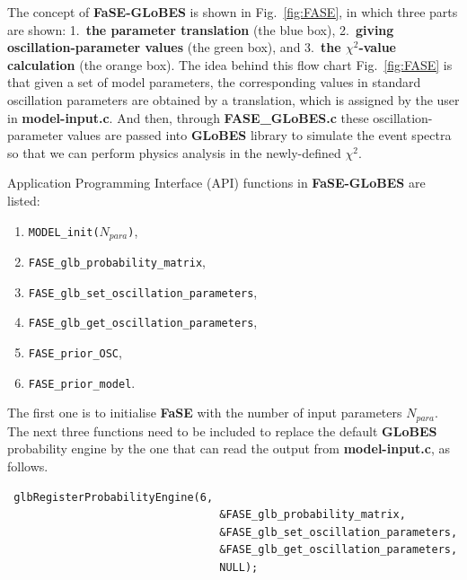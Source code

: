 \documentclass[aps,prd,nofootinbib,preprint]{revtex4}
\begin{document}
The concept of \textbf{FaSE-GLoBES} is shown in Fig.~\ref{fig:FASE}, in which three parts are shown: 1.~\textbf{the parameter translation} (the blue box), 2.~\textbf{giving oscillation-parameter values} (the green box), and 3.~\textbf{the $\chi^2$-value calculation} (the orange box). 
The idea behind this flow chart Fig.~\ref{fig:FASE} is that given a set of model parameters, the corresponding values in standard oscillation parameters are obtained by a translation, which is assigned by the user in \textbf{model-input.c}. And then, through \textbf{FASE\_GLoBES.c} these oscillation-parameter values are passed into \textbf{GLoBES} library to simulate the event spectra so that we can perform physics analysis in the newly-defined $\chi^2$. 


Application Programming Interface (API) functions in \textbf{FaSE-GLoBES} are listed:
\begin{enumerate}
\item \texttt{MODEL\_init($N_{para}$)},
\item  \texttt{FASE\_glb\_probability\_matrix},
\item  \texttt{FASE\_glb\_set\_oscillation\_parameters},
\item  \texttt{FASE\_glb\_get\_oscillation\_parameters},
\item \texttt{FASE\_prior\_OSC},
\item \texttt{FASE\_prior\_model}.
\end{enumerate}
The first one is to initialise \textbf{FaSE} with the number of input parameters $N_{para}$. The next three functions need to be included to replace the default \textbf{GLoBES} probability engine by the one that can read the output from \textbf{model-input.c}, as follows.
\begin{verbatim}
 glbRegisterProbabilityEngine(6,
                                 &FASE_glb_probability_matrix,
                                 &FASE_glb_set_oscillation_parameters,
                                 &FASE_glb_get_oscillation_parameters,
                                 NULL);
\end{verbatim}
\end{document}
